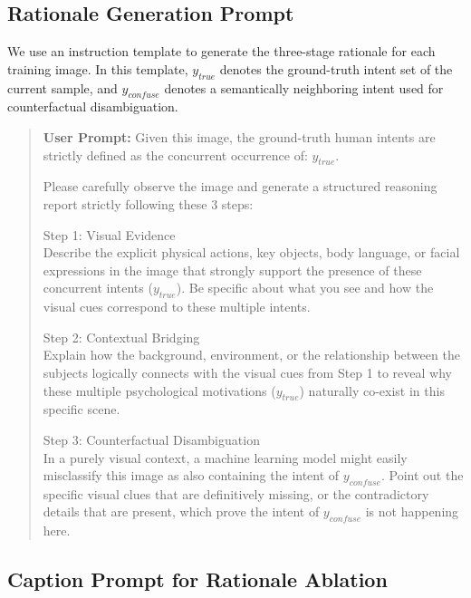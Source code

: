 \subsection{Rationale Generation Prompt}
\label{app:rationale_prompt}

We use an instruction template to generate the three-stage rationale for each training image.
In this template, ${y_{true}}$ denotes the ground-truth intent set of the current sample, and ${y_{confuse}}$ denotes a semantically neighboring intent used for counterfactual disambiguation.

\begin{quote}

\textbf{User Prompt:} Given this image, the ground-truth human intents are strictly defined as the concurrent occurrence of: ${y_{true}}$.

Please carefully observe the image and generate a structured reasoning report strictly following these 3 steps:

Step 1: Visual Evidence \\
Describe the explicit physical actions, key objects, body language, or facial expressions in the image that strongly support the presence of these concurrent intents (${y_{true}}$). Be specific about what you see and how the visual cues correspond to these multiple intents.

Step 2: Contextual Bridging \\
Explain how the background, environment, or the relationship between the subjects logically connects with the visual cues from Step 1 to reveal why these multiple psychological motivations (${y_{true}}$) naturally co-exist in this specific scene.

Step 3: Counterfactual Disambiguation \\
In a purely visual context, a machine learning model might easily misclassify this image as also containing the intent of ${y_{confuse}}$. Point out the specific visual clues that are definitively missing, or the contradictory details that are present, which prove the intent of ${y_{confuse}}$ is not happening here.
\end{quote}

\subsection{Caption Prompt for Rationale Ablation}

